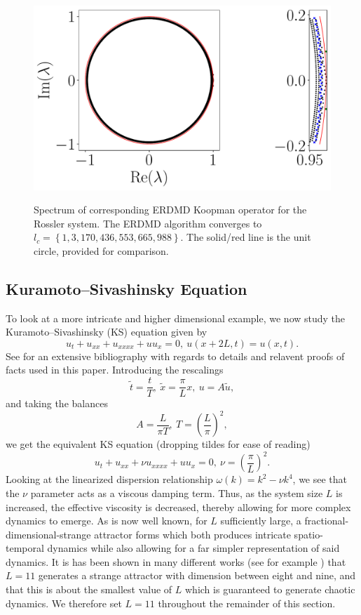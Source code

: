 \documentclass[a4paper,11pt]{article}
\begin{document}
\begin{figure}[!h]
\centering
\includegraphics[width=1.\textwidth]{Rossler_detail_spectrum_w_mx_lag_988}\\
\caption{Spectrum of corresponding ERDMD Koopman operator for the Rossler system.  The ERDMD algorithm converges to $l_{c}= \left\{1, 3, 170, 436, 553, 665, 988\right\}$.  The solid/red line is the unit circle, provided for comparison.}
\label{fig:rossler_spectrum}
\end{figure}

\subsection*{Kuramoto--Sivashinsky Equation}
To look at a more intricate and higher dimensional example, we now study the Kuramoto--Sivashinsky (KS) equation given by 
\[
u_{t} + u_{xx} + u_{xxxx} + uu_{x} = 0, ~ u(x+2L,t) = u(x,t).
\]
See \cite{robinson} for an extensive bibliography with regards to details and relavent proofs of facts used in this paper.  Introducing the rescalings
\[
\tilde{t} =\frac{t}{T}, ~ \tilde{x} = \frac{\pi}{L}x, ~ u = A\tilde{u},
\]
and taking the balances
\[
A = \frac{L}{\pi T}, ~ T = \left(\frac{L}{\pi}\right)^{2}, 
\]
we get the equivalent KS equation (dropping tildes for ease of reading)
\[
u_{t} + u_{xx} + \nu u_{xxxx} + uu_{x} = 0, ~ \nu = \left(\frac{\pi}{L}\right)^{2}.
\]
Looking at the linearized dispersion relationship $\omega(k) = k^{2} - \nu k^{4}$, we see that the $\nu$ parameter acts as a viscous damping term.  Thus, as the system size $L$ is increased, the effective viscosity is decreased, thereby allowing for more complex dynamics to emerge.  As is now well known, for $L$ sufficiently large, a fractional-dimensional-strange attractor forms which both produces intricate spatio-temporal dynamics while also allowing for a far simpler representation of said dynamics.  It is has been shown in many different works (see for example \cite{citanovic}) that $L=11$ generates a strange attractor with dimension between eight and nine, and that this is about the smallest value of $L$ which is guaranteed to generate chaotic dynamics.  We therefore set $L=11$ throughout the remainder of this section.  
\end{document}
